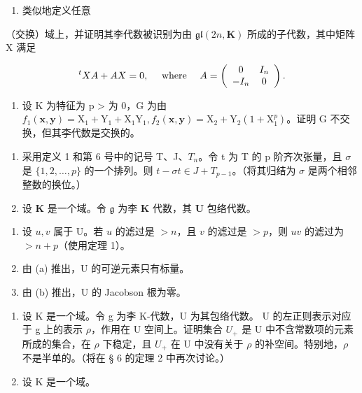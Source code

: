 \begin{enumerate}
\def\labelenumi{(\alph{enumi})}
\setcounter{enumi}{2}
\tightlist
\item
  类似地定义任意
\end{enumerate}

（交换）域上，并证明其李代数被识别为由 \(\mathfrak{gl}(2n,\mathbf{K})\) 所成的子代数，其中矩阵 X 满足

\[
{ } ^ { t } X A + A X = 0 , \quad \text {   where   } \quad A = \left( \begin{array} { c c } 0 & I _ { n } \\ - I _ { n } & 0 \end{array} \right) .
\]

\begin{enumerate}
\def\labelenumi{\arabic{enumi}.}
\setcounter{enumi}{26}
\tightlist
\item
  设 K 为特征为 p \textgreater{} 为 0，G 为由 \(f_{1}(\mathbf{x}, \mathbf{y}) = \mathrm{X}_{1} + \mathrm{Y}_{1} + \mathrm{X}_{1}\mathrm{Y}_{1}, f_{2}(\mathbf{x}, \mathbf{y}) = \mathrm{X}_{2} + \mathrm{Y}_{2}(1 + \mathrm{X}_{1}^{p})\)。证明 G 不交换，但其李代数是交换的。
\end{enumerate}


\begin{enumerate}
\def\labelenumi{\arabic{enumi}.}
\item
  采用定义 1 和第 6 号中的记号 T、J、\(T_{n}\)。令 t 为 T 的 p 阶齐次张量，且 \(\sigma\) 是 \(\{1, 2, \ldots, p\}\) 的一个排列。则 \(t - \sigma t \in J + T_{p-1}\)。（将其归结为 \(\sigma\) 是两个相邻整数的换位。）
\item
  设 \(\mathbf{K}\) 是一个域。令 \(\mathfrak{g}\) 为李 \(\mathbf{K}\) 代数，其 \(\mathbf{U}\) 包络代数。
\end{enumerate}

\begin{enumerate}
\def\labelenumi{(\alph{enumi})}
\item
  设 \(u, v\) 属于 U。若 \(u\) 的滤过是 \(> n\)，且 \(v\) 的滤过是 \(> p\)，则 \(uv\) 的滤过为 \(> n + p\)（使用定理 1）。
\item
  由 (a) 推出，U 的可逆元素只有标量。
\item
  由 (b) 推出，U 的 Jacobson 根为零。
\end{enumerate}

\begin{enumerate}
\def\labelenumi{\arabic{enumi}.}
\setcounter{enumi}{2}
\item
  设 K 是一个域。令 g 为李 K-代数，U 为其包络代数。 U 的左正则表示对应于 g 上的表示 \(\rho\)，作用在 U 空间上。证明集合 \(U_{+}\) 是 U 中不含常数项的元素所成的集合，在 \(\rho\) 下稳定，且 \(U_{+}\) 在 U 中没有关于 \(\rho\) 的补空间。特别地，\(\rho\) 不是半单的。（将在 § 6 的定理 2 中再次讨论。）
\item
  设 K 是一个域。
\end{enumerate}

